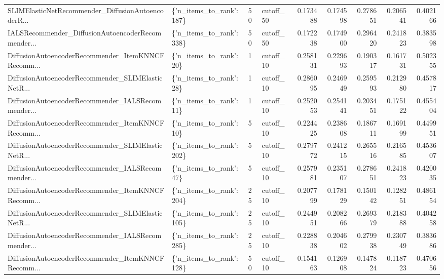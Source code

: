 \begin{tabular}{llllrrrrr}
SLIMElasticNetRecommender\_DiffusionAutoencoderR... & \{'n\_items\_to\_rank': 187\} &       50 & cutoff\_50 & 0.173488 &   0.174598 &       0.278651 &           0.206541 &            0.402166 \\
IALSRecommender\_DiffusionAutoencoderRecommender... & \{'n\_items\_to\_rank': 338\} &       50 & cutoff\_50 & 0.172238 &   0.174900 &       0.296420 &           0.241823 &            0.383598 \\
DiffusionAutoencoderRecommender\_ItemKNNCFRecomm... &  \{'n\_items\_to\_rank': 20\} &        1 & cutoff\_10 & 0.258131 &   0.229693 &       0.190317 &           0.161731 &            0.502355 \\
DiffusionAutoencoderRecommender\_SLIMElasticNetR... &  \{'n\_items\_to\_rank': 28\} &        1 & cutoff\_10 & 0.286095 &   0.246949 &       0.259593 &           0.212980 &            0.457817 \\
DiffusionAutoencoderRecommender\_IALSRecommender... &  \{'n\_items\_to\_rank': 11\} &        1 & cutoff\_10 & 0.252053 &   0.254141 &       0.203451 &           0.175122 &            0.455404 \\
DiffusionAutoencoderRecommender\_ItemKNNCFRecomm... &  \{'n\_items\_to\_rank': 10\} &        5 & cutoff\_10 & 0.224425 &   0.238608 &       0.186711 &           0.169199 &            0.449951 \\
DiffusionAutoencoderRecommender\_SLIMElasticNetR... & \{'n\_items\_to\_rank': 202\} &        5 & cutoff\_10 & 0.279772 &   0.241215 &       0.265516 &           0.216585 &            0.453607 \\
DiffusionAutoencoderRecommender\_IALSRecommender... &  \{'n\_items\_to\_rank': 47\} &        5 & cutoff\_10 & 0.257981 &   0.235107 &       0.278651 &           0.241823 &            0.420035 \\
DiffusionAutoencoderRecommender\_ItemKNNCFRecomm... & \{'n\_items\_to\_rank': 204\} &       25 & cutoff\_10 & 0.207799 &   0.178129 &       0.150142 &           0.128251 &            0.486154 \\
DiffusionAutoencoderRecommender\_SLIMElasticNetR... & \{'n\_items\_to\_rank': 105\} &       25 & cutoff\_10 & 0.244951 &   0.208266 &       0.269379 &           0.218388 &            0.404258 \\
DiffusionAutoencoderRecommender\_IALSRecommender... & \{'n\_items\_to\_rank': 285\} &       25 & cutoff\_10 & 0.228838 &   0.204602 &       0.279938 &           0.230749 &            0.383686 \\
DiffusionAutoencoderRecommender\_ItemKNNCFRecomm... & \{'n\_items\_to\_rank': 128\} &       50 & cutoff\_10 & 0.154163 &   0.126908 &       0.147824 &           0.118723 &            0.470656 \\

\end{tabular}
